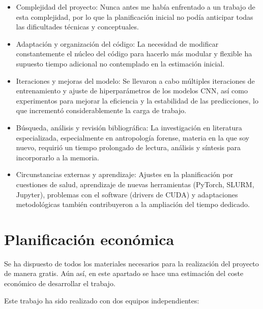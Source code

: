 \begin{itemize}

    \item Complejidad del proyecto: Nunca antes me había enfrentado a un trabajo de esta complejidad, por lo que la planificación inicial no podía anticipar todas las dificultades técnicas y conceptuales.
    
    \item Adaptación y organización del código: La necesidad de modificar constantemente el núcleo del código para hacerlo más modular y flexible ha supuesto tiempo adicional no contemplado en la estimación inicial.
    
    \item Iteraciones y mejoras del modelo: Se llevaron a cabo múltiples iteraciones de entrenamiento y ajuste de hiperparámetros de los modelos CNN, así como experimentos para mejorar la eficiencia y la estabilidad de las predicciones, lo que incrementó considerablemente la carga de trabajo.
    
    \item Búsqueda, análisis y revisión bibliográfica: La investigación en literatura especializada, especialmente en antropología forense, materia en la que soy nuevo, requirió un tiempo prolongado de lectura, análisis y síntesis para incorporarlo a la memoria.
    
    \item Circunstancias externas y aprendizaje: Ajustes en la planificación por cuestiones de salud, aprendizaje de nuevas herramientas (PyTorch, SLURM, Jupyter), problemas con el software (drivers de CUDA) y adaptaciones metodológicas también contribuyeron a la ampliación del tiempo dedicado.

\end{itemize}


\section{Planificación económica}

Se ha dispuesto de todos los materiales necesarios para la realización del proyecto de manera gratis. Aún así, en este apartado se hace una estimación del coste económico de desarrollar el trabajo.

Este trabajo ha sido realizado con dos equipos independientes: 

